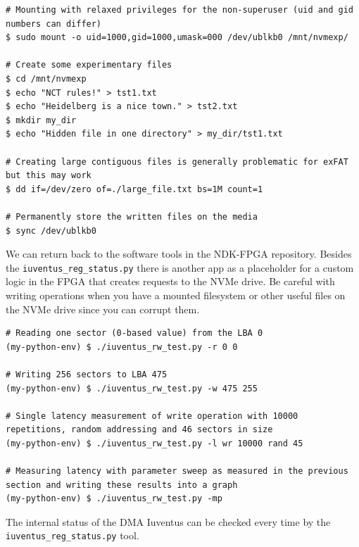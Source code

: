 \begin{lstlisting}[caption={Formatting the created ublk device}]
# Mounting with relaxed privileges for the non-superuser (uid and gid numbers can differ)
$ sudo mount -o uid=1000,gid=1000,umask=000 /dev/ublkb0 /mnt/nvmexp/

# Create some experimentary files
$ cd /mnt/nvmexp
$ echo "NCT rules!" > tst1.txt
$ echo "Heidelberg is a nice town." > tst2.txt
$ mkdir my_dir
$ echo "Hidden file in one directory" > my_dir/tst1.txt

# Creating large contiguous files is generally problematic for exFAT but this may work
$ dd if=/dev/zero of=./large_file.txt bs=1M count=1

# Permanently store the written files on the media
$ sync /dev/ublkb0
\end{lstlisting}

We can return back to the software tools in the NDK-FPGA repository. Besides the
\verb|iuventus_reg_status.py| there is another app as a placeholder for a custom logic in the FPGA
that creates requests to the NVMe drive\footnotemark. Be careful with writing operations when you
have a mounted filesystem or other useful files on the NVMe drive since you can corrupt them.



\begin{lstlisting}[caption={Creating requests from the FPGA}]
# Reading one sector (0-based value) from the LBA 0
(my-python-env) $ ./iuventus_rw_test.py -r 0 0

# Writing 256 sectors to LBA 475
(my-python-env) $ ./iuventus_rw_test.py -w 475 255

# Single latency measurement of write operation with 10000 repetitions, random addressing and 46 sectors in size
(my-python-env) $ ./iuventus_rw_test.py -l wr 10000 rand 45

# Measuring latency with parameter sweep as measured in the previous section and writing these results into a graph
(my-python-env) $ ./iuventus_rw_test.py -mp
\end{lstlisting}

The internal status of the DMA Iuventus can be checked every time by the
\verb|iuventus_reg_status.py| tool.

